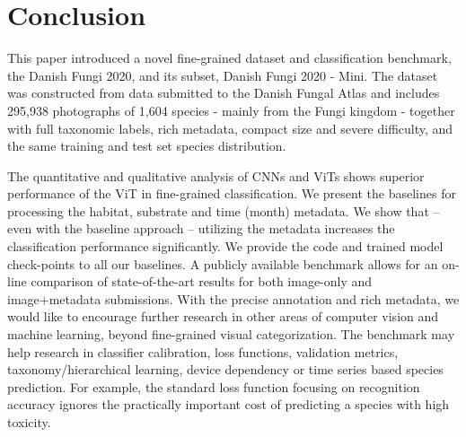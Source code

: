 \documentclass[10pt,twocolumn,letterpaper]{article}
\begin{document}
\section{Conclusion}

This paper introduced a novel fine-grained dataset and classification benchmark, the Danish Fungi 2020, and its subset, Danish Fungi 2020 - Mini. 
The dataset was constructed from data submitted to the Danish Fungal Atlas and includes 295,938 photographs of 1,604 species - mainly from the Fungi kingdom - together with full taxonomic labels, rich metadata, compact size and severe difficulty, and the same training and test set species distribution.

The quantitative and qualitative analysis of CNNs and ViTs shows superior performance of the ViT in fine-grained classification. We present the baselines for processing the habitat, substrate and time (month) metadata. We show that – even with the baseline approach – utilizing the metadata increases the classification performance significantly. We provide the code and trained model check-points to all our baselines. 
A publicly available benchmark allows for an on-line comparison of state-of-the-art results for both image-only and image+metadata submissions. With the precise annotation and rich metadata, we would like to encourage further research in other areas of computer vision and machine learning, beyond fine-grained visual categorization. The benchmark may help research in classifier calibration, loss functions, validation metrics, taxonomy/hierarchical learning, device dependency or time series based species prediction. For example, the standard loss function focusing on recognition accuracy ignores the practically important cost of predicting a species with high toxicity. 







{\small


}
\end{document}

